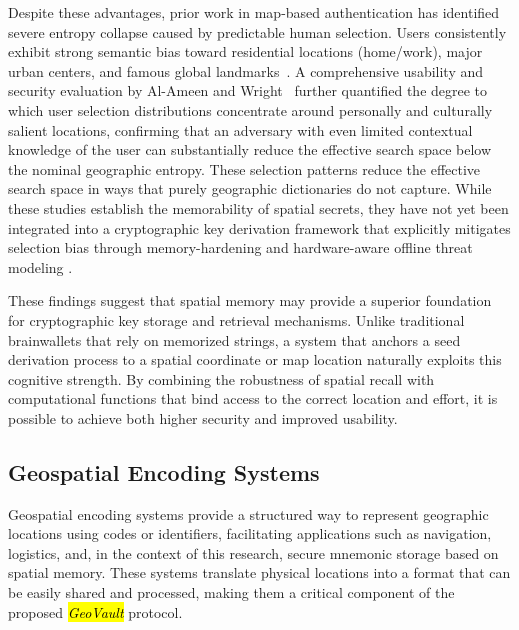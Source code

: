 \documentclass[mathematics,article,accept,pdftex,moreauthors]{Definitions/mdpi}
\begin{document}
{Despite these advantages, prior work in map-based authentication has identified severe entropy collapse caused by predictable human selection. Users consistently exhibit strong semantic bias toward residential locations (home/work), major urban centers, and famous global landmarks~\cite{Sun2012, Thorpe2013, AlAmeen2014}. A comprehensive usability and security evaluation by Al-Ameen and Wright~\cite{AlAmeen2014} further quantified the degree to which user selection distributions concentrate around personally and culturally salient locations, confirming that an adversary with even limited contextual knowledge of the user can substantially reduce the effective search space below the nominal geographic entropy. These selection patterns reduce the effective search space in ways that purely geographic dictionaries do not capture. While these studies establish the memorability of spatial secrets, they have not yet been integrated into a cryptographic key derivation framework that explicitly mitigates selection bias through memory-hardening and hardware-aware offline threat modeling %
	.}

{These findings suggest that spatial memory may provide a superior foundation for cryptographic key storage and retrieval mechanisms. Unlike traditional brainwallets that rely on memorized strings, a system that anchors a seed derivation process to a spatial coordinate or map location naturally exploits this cognitive strength. By combining the robustness of spatial recall with computational functions that bind access to the correct location and effort, it is possible to achieve both higher security and improved usability.}

\subsection{Geospatial Encoding Systems}

Geospatial encoding systems provide a structured way to represent geographic locations using codes or identifiers, facilitating applications such as navigation, logistics, and, in the context of this research, secure mnemonic storage based on spatial memory. These systems translate physical locations into a format that can be easily shared and processed, making them a critical component of the proposed \textit{\hl{GeoVault}} protocol.
\end{document}
